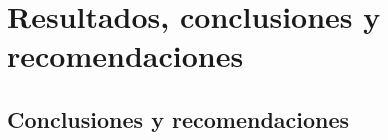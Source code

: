 \documentclass[a4paper,12pt, oneside]{book}
\begin{document}
	\part{Resultados, conclusiones y recomendaciones}
		\chapter{Conclusiones y recomendaciones} \label{chap:conclusiones}
		
		
%		
%	
%		
%		
%		
%		
%		
%		
%		
%		
%		
\end{document}
